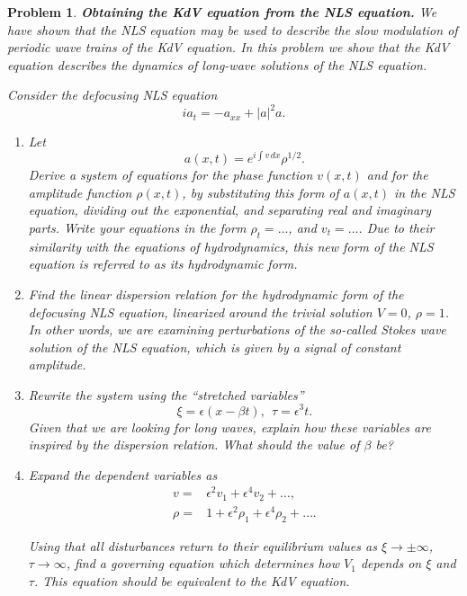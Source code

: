 \documentclass[12pt]{report}
\newtheorem{problem}{Problem}
\def\eps{{\epsilon}}
\begin{document}
\newpage



\begin{problem}
    {\bf Obtaining the KdV equation from the NLS equation.} We have shown that the NLS equation may be used to describe the slow modulation of periodic wave trains of the KdV equation. In this problem we show that the KdV equation describes the dynamics of long-wave solutions of the NLS equation. 

Consider the defocusing NLS equation
\[
i a_t=-a_{xx}+|a|^2 a.
\]

\begin{enumerate}

\item[{\bf a.}] Let
\[
a(x,t)=e^{i \int v \,dx} \rho^{1/2}.
\]
Derive a system of equations for the phase function $v(x,t)$ and for the amplitude function $\rho(x,t)$, by substituting this form of $a(x,t)$ in the NLS equation, dividing out the exponential, and separating real and imaginary parts. Write your equations in the form $\rho_t=\ldots$, and $v_t=\ldots$. Due to their similarity with the equations of hydrodynamics, this new form of the NLS equation is referred to as its {\em hydrodynamic form}.

\item[{\bf b.}] Find the linear dispersion relation for the hydrodynamic form of the defocusing NLS equation, linearized around the trivial solution $V=0$, $\rho=1$. In other words, we are examining perturbations of the so-called Stokes wave solution of the NLS equation, which is given by a signal of constant amplitude.

\item[{\bf c.}] Rewrite the system using the ``stretched variables''
\[
\xi=\eps(x-\beta t), ~~\tau=\eps^{3} t.
\]
Given that we are looking for long waves, explain how these variables are inspired
by the dispersion relation. What should the value of $\beta$ be?

\item[{\bf d.}] Expand the dependent variables as
\begin{align*}
    v=&\epsilon^2 v_1+\epsilon^4 v_2+\ldots, \\
    \rho=&1+\epsilon^2 \rho_1+\epsilon^4 \rho_2+\ldots.
\end{align*}

Using that all disturbances return to their equilibrium values as $\xi\rightarrow \pm \infty$,
$\tau \rightarrow \infty$, find a governing equation which determines how $V_1$ depends on
$\xi$ and $\tau$. This equation should be equivalent to the KdV equation.

\end{enumerate}
\end{problem}
\end{document}
